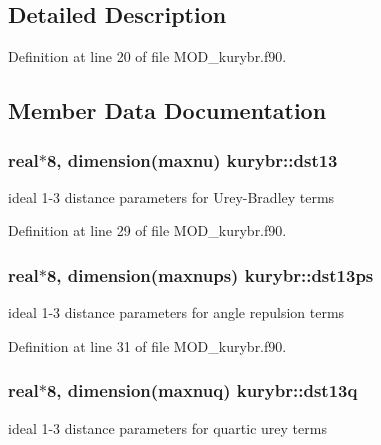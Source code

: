 \subsection{Detailed Description}


Definition at line 20 of file M\-O\-D\-\_\-kurybr.\-f90.



\subsection{Member Data Documentation}
\hypertarget{classkurybr_ad04267e2ab89ff58d358e0c438293a9c}{
\subsubsection[{dst13}]{\setlength{\rightskip}{0pt plus 5cm}real$\ast$8, dimension({\bf maxnu}) kurybr\-::dst13}}\label{classkurybr_ad04267e2ab89ff58d358e0c438293a9c}


ideal 1-\/3 distance parameters for Urey-\/\-Bradley terms 



Definition at line 29 of file M\-O\-D\-\_\-kurybr.\-f90.

\hypertarget{classkurybr_a9ac144f5e89f0ff12d278007608b9d0f}{
\subsubsection[{dst13ps}]{\setlength{\rightskip}{0pt plus 5cm}real$\ast$8, dimension({\bf maxnups}) kurybr\-::dst13ps}}\label{classkurybr_a9ac144f5e89f0ff12d278007608b9d0f}


ideal 1-\/3 distance parameters for angle repulsion terms 



Definition at line 31 of file M\-O\-D\-\_\-kurybr.\-f90.

\hypertarget{classkurybr_a87b9e3e0c32664e7aa531fef6e7cd9bc}{
\subsubsection[{dst13q}]{\setlength{\rightskip}{0pt plus 5cm}real$\ast$8, dimension({\bf maxnuq}) kurybr\-::dst13q}}\label{classkurybr_a87b9e3e0c32664e7aa531fef6e7cd9bc}


ideal 1-\/3 distance parameters for quartic urey terms 



